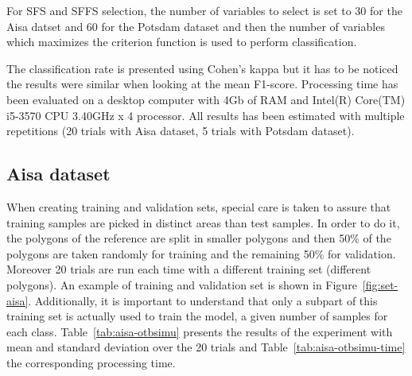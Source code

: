 \documentclass[journal,peerreview,onecolumn]{IEEEtran}
\begin{document}
    For SFS and SFFS selection, the number of variables to select is set to 30 for the Aisa datset and 60 for the Potsdam dataset and then the number of variables which maximizes the criterion function is used to perform classification.

    The classification rate is presented using Cohen's kappa but it has to be noticed the results were similar when looking at the mean F1-score. Processing time has been evaluated on a desktop computer with 4Gb of RAM and Intel(R) Core(TM) i5-3570 CPU \@ 3.40GHz x 4 processor. All results has been estimated with multiple repetitions (20 trials with Aisa dataset, 5 trials with Potsdam dataset).

    \subsection{Aisa dataset}
    \label{sec:aisa}

    When creating training and validation sets, special care is taken to assure that training samples are picked in distinct areas than test samples. In order to do it, the polygons of the reference are split in smaller polygons and then 50\% of the polygons are taken randomly for training and the remaining 50\% for validation. Moreover 20 trials are run each time with a different training set (different polygons). An example of training and validation set is shown in Figure~\ref{fig:set-aisa}. Additionally, it is important to understand that only a subpart of this training set is actually used to train the model, a given number of samples for each class. Table~\ref{tab:aisa-otbsimu} presents the results of the experiment with mean and standard deviation over the 20 trials and Table~\ref{tab:aisa-otbsimu-time} the corresponding processing time.
\end{document}
